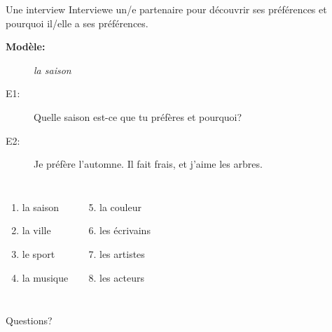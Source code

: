 \documentclass{beamer}
\begin{document}
  \begin{frame}{Une interview}
    Interviewe un/e partenaire pour découvrir ses préférences et pourquoi il/elle a ses préférences.
    \begin{description}
      \item[\textbf{Modèle:}] \textit{la saison}
      \item[E1:] Quelle saison est-ce que tu préfères et pourquoi?
      \item[E2:] Je préfère l'automne. Il fait frais, et j'aime les arbres.
    \end{description}
    \begin{columns}[t]
        \begin{enumerate}
          \item la saison
          \item la ville
          \item le sport
          \item la musique
        \end{enumerate}
        \begin{enumerate}
          \setcounter{enumi}{4}
          \item la couleur
          \item les écrivains
          \item les artistes
          \item les acteurs
        \end{enumerate}
    \end{columns}
  \end{frame}

  \begin{frame}{}
    \begin{center}
      \Large Questions?
    \end{center}
  \end{frame}
\end{document}
